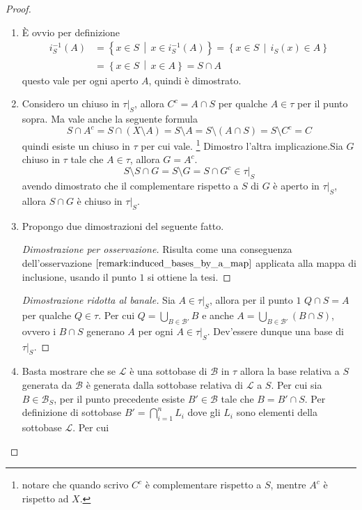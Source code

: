 \begin{proof} \
\begin{enumerate}
	\item
		È ovvio per definizione
		\begin{align*}
		i^{-1}_S(A) & = \left\{x \in S \,\middle|\, x \in i_S^{-1}(A) \right\} = \left\{x \in S \,\middle|\, i_S(x) \in A \right\}\\
		& = \left\{x \in S \,\middle|\, x \in A\right\} = S \cap A 
		\end{align*}
		questo vale per ogni aperto $A$, quindi è dimostrato.
	\item 
		Considero un chiuso in $\tau|_S$, allora $C^c = A \cap S$ per qualche $A \in \tau$ per il punto sopra. Ma vale anche la seguente formula
		\begin{equation*}
			S \cap A^c = S \cap (X \setminus A) = S \setminus A = S \setminus (A \cap S) = S \setminus C^c = C 
		\end{equation*}
		quindi esiste un chiuso in $\tau$ per cui vale. \footnote{notare che quando scrivo $C^c$ è complementare rispetto a $S$, mentre $A^c$ è rispetto ad $X$.}
		Dimostro l'altra implicazione.Sia $G$ chiuso in $\tau$ tale che $A \in \tau$, allora $G = A^c$.
		\begin{equation*}
			S \setminus S \cap G = S \setminus G = S \cap G^c \in \tau|_S 
		\end{equation*}  
		avendo dimostrato che il complementare rispetto a $S$ di $G$ è aperto in $\tau|_S$, allora $S \cap G$ è chiuso in $\tau|_S$. 
	\item Propongo due dimostrazioni del seguente fatto.
	\begin{proof}[Dimostrazione per osservazione]
		Risulta come una conseguenza dell'osservazione $\ref{remark:induced_bases_by_a_map}$ applicata alla mappa di inclusione, usando il punto $1$ si ottiene la tesi.
	\end{proof}
	\begin{proof}[Dimostrazione ridotta al banale]
		Sia $A \in \tau|_S$, allora per il punto $1$ $Q \cap S = A$ per qualche $Q \in \tau$. Per cui $Q = \bigcup_{B \in \mathcal{B}'} B$ e anche $A = \bigcup_{B \in \mathcal{B}'} (B \cap S)$, ovvero i $B \cap S$ generano $A$ per ogni $A \in \tau|_S$. Dev'essere dunque una base di $\tau|_S$. 
	\end{proof}
	\item 
		Basta mostrare che se $\mathcal{L}$ è una sottobase di $\mathcal{B}$ in $\tau$ allora la base relativa a $S$ generata da $\mathcal{B}$ è generata dalla sottobase relativa di $\mathcal{L}$ a $S$. Per cui sia $B \in \mathcal{B}_S$, per il punto precedente esiste $B' \in \mathcal{B}$ tale che $B = B' \cap S$. Per definizione di sottobase $B' = \bigcap^{n}_{i =1}L_i$ dove gli $L_i$ sono elementi della sottobase $\mathcal{L}$. Per cui

\end{enumerate}
\end{proof}
